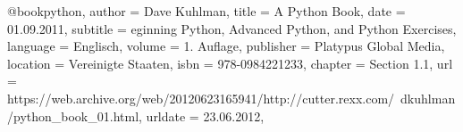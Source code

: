 @book{python,
	author = {Dave Kuhlman},
	title = {A Python Book},
	date = {01.09.2011},
	subtitle = {eginning Python, Advanced Python, and Python Exercises},
	language = {Englisch},
	volume = {1. Auflage},
	publisher = {Platypus Global Media},
	location = {Vereinigte Staaten},
	isbn = {978-0984221233},
	chapter = {Section 1.1},
	url = {https://web.archive.org/web/20120623165941/http://cutter.rexx.com/~dkuhlman/python_book_01.html},
	urldate = {23.06.2012},
}